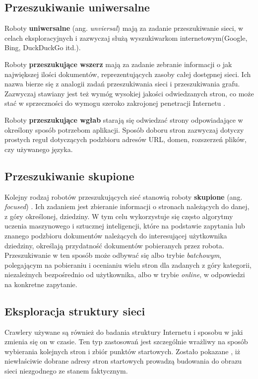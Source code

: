 \subsection{Przeszukiwanie uniwersalne}
\label{subsec:przUniw}
Roboty \textbf{uniwersalne} (ang. \emph{unviersal}) \cite[s. 311-315]{webMining} mają za zadanie przeszukiwanie sieci, w celach eksploracyjnych i zazwyczaj służą wyszukiwarkom internetowym(Google, Bing, DuckDuckGo itd.).

Roboty \textbf{przeszukujące wszerz} mają za zadanie zebranie informacji o jak największej ilości dokumentów, reprezentujących zasoby całej dostępnej sieci. Ich nazwa bierze się z analogii zadań przeszukiwania sieci i przeszukiwania grafu. Zazwyczaj stawiany jest też wymóg wysokiej jakości odwiedzanych stron, co może stać w sprzeczności do wymogu szeroko zakrojonej penetracji Internetu \cite{webCrawling}.

Roboty \textbf{przeszukujące wgłab} \cite{webCrawling} starają się odwiedzać strony odpowiadające w określony sposób potrzebom aplikacji. Sposób doboru stron zazwyczaj dotyczy prostych reguł dotyczących podzbioru adresów URL, domen, rozszerzeń plików, czy używanego języka. 

\subsection{Przeszukiwanie skupione}
\label{subsec:przSkup}
Kolejny rodzaj robotów przeszukujących sieć stanowią roboty \textbf{skupione} (ang. \emph{focused}) \cite{FocusedCrawlers}. Ich zadaniem jest zbieranie informacji o stronach należących do danej, z góry określonej, dziedziny. W tym celu wykorzystuje się często algorytmy uczenia maszynowego i sztucznej inteligencji\cite[s. 327-330]{webMining}, które na podstawie zapytania lub znanego podzbioru dokumentów należących do interesującej użytkownika dziedziny, określają przydatność dokumentów pobieranych przez robota. Przeszukiwanie w ten sposób może odbywać się albo trybie \emph{batchowym}, polegającym na pobieraniu i ocenianiu wielu stron dla zadanych z góry kategorii, niezależnych bezpośrednio od użytkownika, albo w trybie \emph{online}, w odpowiedzi na konkretne zapytanie.

\subsection{Eksploracja struktury sieci}
\label{subsec:eksplStr}
Crawlery używane są również do badania struktury Internetu i sposobu w jaki zmienia się on w czasie. Ten typ zastosowań jest szczególnie wrażliwy na sposób wybierania kolejnych stron i zbiór punktów startowych. Zostało pokazane \cite{biasedCrawlers}, iż niewłaściwie dobrane adresy stron startowych prowadzą budowania do obrazu sieci niezgodnego ze stanem faktycznym.


